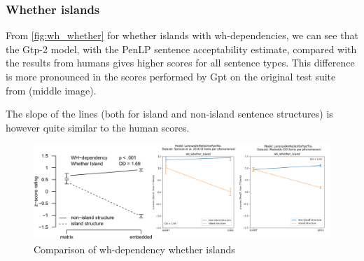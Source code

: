 






\subsubsection{Whether islands}

From \autoref{fig:wh_whether} for whether islands with wh-dependencies, we can see that the Gtp-2 model, with the PenLP sentence acceptability estimate, compared with the results from humans gives higher scores for all sentence types. This difference is more pronounced in the scores performed by Gpt on the original test suite from \citet{sprouse2016experimental} (middle image). 

The slope of the lines (both for island and non-island sentence structures) is however quite similar to the human scores. \\


\begin{figure}[H]
	\centering
	\includegraphics[width=1\textwidth]{images/Chapter1/combined_wh-whether.png} %
	\caption{Comparison of wh-dependency whether islands} 
	\label{fig:wh_whether} %
\end{figure}

